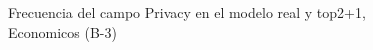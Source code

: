 \begin{figure}[H]
    \centering
    
    \caption{Frecuencia del campo Privacy en el modelo real y top2+1, Economicos (B-3)}
    \label{frecuency-Privacy-top2+1}
\end{figure}